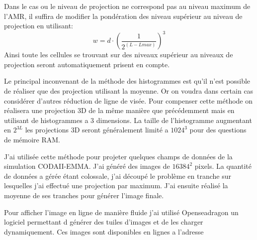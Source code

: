 Dans le cas ou le niveau de projection ne correspond pas au niveau maximum de l'AMR, il suffira de modifier la pondération des niveau supérieur au niveau de projection en utilisant:
\begin{equation}
w = d \cdot \left( \frac{1}{2^{(L-Lmax)} }\right)^3
\end{equation}
Ainsi toute les cellules se trouvant sur des niveaux supérieur au niveaux de projection seront automatiquement prisent en compte.

Le principal inconvenant de la méthode des histogrammes est qu'il n'est possible de réaliser que des projection utilisant la moyenne.
Or on voudra dans certain cas considérer d'autres réduction de ligne de visée.
Pour compenser cette méthode on réalisera une projection 3D de la même manière que précédemment mais en utilisant de histogrammes a 3 dimensions.
La taille de l'histogramme augmentant en $2^{3L}$ les projections 3D seront généralement limité a $1024^3$ pour des questions de mémoire RAM. 


J'ai utilisée cette méthode pour projeter quelques champs de données de la simulation CODAII-EMMA.
J'ai généré des images de $16384^2$ pixels.
La quantité de données a gérée étant colossale, j'ai découpé le problème en tranche sur lesquelles j'ai effectué une projection par maximum.
J'ai ensuite réalisé la moyenne de ses tranches pour générer l'image finale.

Pour afficher l'image en ligne de manière fluide j'ai utilisé Openseadragon %
un logiciel permettant d générer des tuiles d'images et de les charger dynamiquement.
Ces images sont disponibles en lignes a l'adresse %

